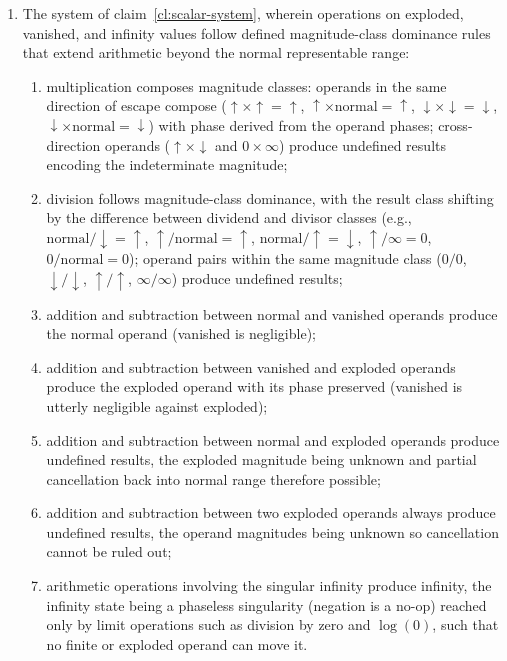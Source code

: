 \documentclass[12pt,letter]{article}
\begin{document}
\begin{enumerate}
    \item The system of claim~\ref{cl:scalar-system}, wherein operations on exploded, vanished, and infinity values follow defined magnitude-class dominance rules that extend arithmetic beyond the normal representable range:
          \begin{enumerate}
              \item multiplication composes magnitude classes: operands in the same direction of escape compose ($\uparrow \times \uparrow = \uparrow$, $\uparrow \times \text{normal} = \uparrow$, $\downarrow \times \downarrow = \downarrow$, $\downarrow \times \text{normal} = \downarrow$) with phase derived from the operand phases; cross-direction operands ($\uparrow \times \downarrow$ and $0 \times \infty$) produce undefined results encoding the indeterminate magnitude;
              \item division follows magnitude-class dominance, with the result class shifting by the difference between dividend and divisor classes (e.g., $\text{normal} / \downarrow = \uparrow$, $\uparrow / \text{normal} = \uparrow$, $\text{normal} / \uparrow = \downarrow$, $\uparrow / \infty = 0$, $0 / \text{normal} = 0$); operand pairs within the same magnitude class ($0/0$, $\downarrow / \downarrow$, $\uparrow / \uparrow$, $\infty / \infty$) produce undefined results;
              \item addition and subtraction between normal and vanished operands produce the normal operand (vanished is negligible);
              \item addition and subtraction between vanished and exploded operands produce the exploded operand with its phase preserved (vanished is utterly negligible against exploded);
              \item addition and subtraction between normal and exploded operands produce undefined results, the exploded magnitude being unknown and partial cancellation back into normal range therefore possible;
              \item addition and subtraction between two exploded operands always produce undefined results, the operand magnitudes being unknown so cancellation cannot be ruled out;
              \item arithmetic operations involving the singular infinity produce infinity, the infinity state being a phaseless singularity (negation is a no-op) reached only by limit operations such as division by zero and $\log(0)$, such that no finite or exploded operand can move it.
          \end{enumerate}


\end{enumerate}
\end{document}
